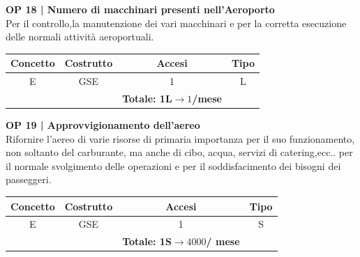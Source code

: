 \vspace{.6cm}


\textbf{\small OP 18 | Numero di macchinari presenti nell'Aeroporto}\\

\textsf{\small Per il controllo,la manutenzione dei vari macchinari e per la corretta esecuzione delle normali attività aeroportuali.}\break

\begin{tabular}{ c c c c}
	\hline
	\textbf{Concetto} & \textbf{Costrutto} & \textbf{Accesi} & \textbf{Tipo}\\
	\hline
	\textsf{\small E} & \textsf{\small GSE} & \textsf{\small 1} &  \textsf{\small L}\\
	\hline
	\textsf{\small } & \textsf{\small } & \textbf{Totale: 1L$\rightarrow 1$/mese } \textsf{\small } & \textsf{\small }\\
	\hline
\end{tabular}

\vspace{.6cm}


\textbf{\small OP 19 | Approvvigionamento dell'aereo}\\

\textsf{\small Rifornire l'aereo di varie risorse di primaria importanza per il suo funzionamento, non soltanto del carburante, ma anche di cibo, acqua, servizi di catering,ecc.. per il normale svolgimento delle operazioni e per il soddisfacimento dei bisogni dei passeggeri.}\break

\begin{tabular}{ c c c c}
	\hline
	\textbf{Concetto} & \textbf{Costrutto} & \textbf{Accesi} & \textbf{Tipo}\\
	\hline
	\textsf{\small E} & \textsf{\small GSE} & \textsf{\small 1} &  \textsf{\small S}\\
	\hline
	\textsf{\small } & \textsf{\small } & \textbf{Totale: 1S$\rightarrow 4000$/ mese} \textsf{\small } & \textsf{\small }\\
	\hline
\end{tabular}

\vspace{.6cm}



